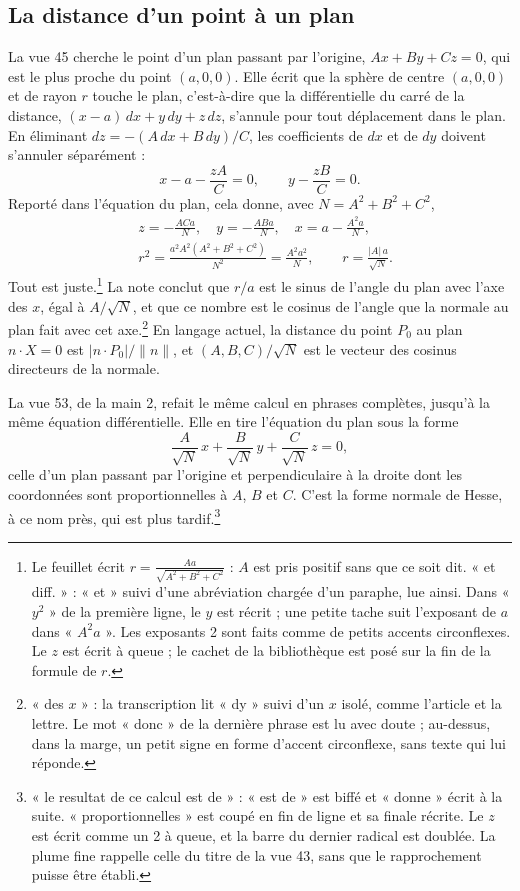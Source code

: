\documentclass[11pt,a4paper]{article}
\begin{document}
\subsection*{La distance d'un point à un plan}

La vue 45 cherche le point d'un plan passant par l'origine,
\(Ax+By+Cz=0\), qui est le plus proche du point \((a,0,0)\). Elle écrit que
la sphère de centre \((a,0,0)\) et de rayon \(r\) touche le plan, c'est-à-dire
que la différentielle du carré de la distance,
\((x-a)\,dx+y\,dy+z\,dz\), s'annule pour tout déplacement dans le plan.
En éliminant \(dz=-(A\,dx+B\,dy)/C\), les coefficients de \(dx\) et de \(dy\)
doivent s'annuler séparément :
\[
x-a-\frac{zA}{C}=0,\qquad y-\frac{zB}{C}=0 .
\]
Reporté dans l'équation du plan, cela donne, avec \(N=A^2+B^2+C^2\),
\[
\begin{aligned}
&z=-\frac{ACa}{N},\quad y=-\frac{ABa}{N},\quad x=a-\frac{A^2a}{N},\\
&r^2=\frac{a^2A^2(A^2+B^2+C^2)}{N^2}=\frac{A^2a^2}{N},\qquad r=\frac{|A|\,a}{\sqrt N}.
\end{aligned}
\]
Tout est juste.\footnote{Le feuillet écrit \(r=\frac{Aa}{\sqrt{A^2+B^2+C^2}}\) :
\(A\) est pris positif sans que ce soit dit. « et diff. » : « et » suivi d'une
abréviation chargée d'un paraphe, lue ainsi. Dans « \(y^2\) » de la première
ligne, le \(y\) est récrit ; une petite tache suit l'exposant de \(a\) dans
« \(A^2a\) ». Les exposants 2 sont faits comme de petits accents circonflexes.
Le \(z\) est écrit à queue ; le cachet de la bibliothèque est posé sur la fin
de la formule de \(r\).} La note conclut que \(r/a\) est le sinus de l'angle du
plan avec l'axe des \(x\), égal à \(A/\sqrt N\), et que ce nombre est le cosinus
de l'angle que la normale au plan fait avec cet axe.\footnote{« des \(x\) » :
la transcription lit « dy » suivi d'un \(x\) isolé, comme l'article et la
lettre. Le mot « donc » de la dernière phrase est lu avec doute ; au-dessus,
dans la marge, un petit signe en forme d'accent circonflexe, sans texte qui
lui réponde.} En langage actuel, la distance du point \(P_0\) au plan
\(n\cdot X=0\) est \(|n\cdot P_0|/\|n\|\), et \((A,B,C)/\sqrt N\) est le
vecteur des cosinus directeurs de la normale.

La vue 53, de la main 2, refait le même calcul en phrases complètes, jusqu'à
la même équation différentielle. Elle en tire l'équation du plan sous la forme
\[
\frac{A}{\sqrt N}\,x+\frac{B}{\sqrt N}\,y+\frac{C}{\sqrt N}\,z=0,
\]
celle d'un plan passant par l'origine et perpendiculaire à la droite dont les
coordonnées sont proportionnelles à \(A\), \(B\) et \(C\). C'est la forme
normale de Hesse, à ce nom près, qui est plus tardif.\footnote{« le resultat
de ce calcul est de » : « est de » est biffé et « donne » écrit à la suite.
« proportionnelles » est coupé en fin de ligne et sa finale récrite. Le \(z\)
est écrit comme un 2 à queue, et la barre du dernier radical est doublée. La
plume fine rappelle celle du titre de la vue 43, sans que le rapprochement
puisse être établi.}
\end{document}
